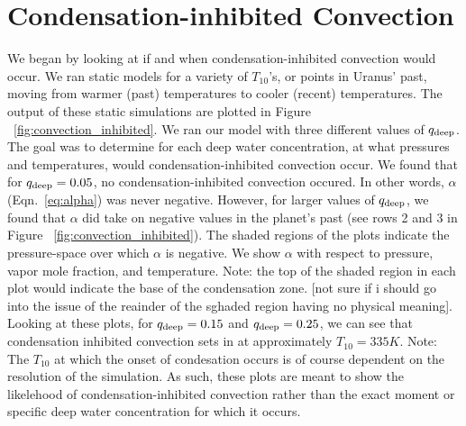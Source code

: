 \documentclass[11pt]{ucscthesisbs}
\begin{document}
\section{Condensation-inhibited Convection}
We began by looking at if and when condensation-inhibited convection would occur. We ran static models for a variety of $T_{10}$'s, or points in Uranus' past, moving from warmer (past) temperatures to cooler (recent) temperatures. The output of these static simulations are plotted in Figure ~\ref{fig:convection_inhibited}. We ran our model with three different values of $q_{\rm deep}$. The goal was to determine for each deep water concentration, at what pressures and temperatures, would condensation-inhibited convection occur. We found that for $q_{\rm deep} = 0.05$, no condensation-inhibited convection occured. In other words, $\alpha$ (Eqn.~\ref{eq:alpha}) was never negative. However, for larger values of $q_{\rm deep}$, we found that $\alpha$ did take on negative values in the planet's past (see rows 2 and 3 in Figure ~\ref{fig:convection_inhibited}). The shaded regions of the plots indicate the pressure-space over which $\alpha$ is negative. We show $\alpha$ with respect to pressure, vapor mole fraction, and temperature. Note: the top of the shaded region in each plot would indicate the base of the condensation zone. [not sure if i should go into the issue of the reainder of the sghaded region having no physical meaning]. Looking at these plots, for $q_{\rm deep} = 0.15$ and $q_{\rm deep} = 0.25$, we can see that condensation inhibited convection sets in at approximately $T_{10} = 335K$. Note: The $T_{10}$ at which the onset of condesation occurs is of course dependent on the resolution of the simulation. As such, these plots are meant to show the likelehood of condensation-inhibited convection rather than the exact moment or specific deep water concentration for which it occurs. 
\end{document}
